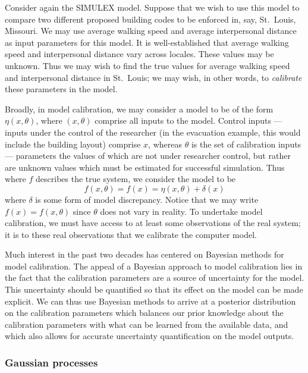 \documentclass{article}
\begin{document}
Consider again the SIMULEX model. Suppose that we wish to use this model to compare two different proposed building codes to be enforced in, say, St.\ Louis, Missouri. We may use average walking speed and average interpersonal distance as input parameters for this model. It is well-established that average walking speed \cite{Bornstein1976} and interpersonal distance \cite{Sorokowska2017} vary across locales. These values may be unknown. Thus we may wish to find the true values for average walking speed and interpersonal distance in St.\ Louis; we may wish, in other words, to \textit{calibrate} these parameters in the model.

Broadly, in model calibration, we may consider a model to be of the form $\eta(x,\theta)$, where $(x,\theta)$ comprise all inputs to the model. Control inputs --- inputs under the control of the researcher (in the evacuation example, this would include the building layout) comprise $x$, whereas $\theta$ is the set of calibration inputs --- parameters the values of which are not under researcher control, but rather are unknown values which must be estimated for successful simulation. Thus where $f$ describes the true system, we consider the model to be 
\begin{equation}f(x,\theta)=f(x)=\eta(x,\theta) + \delta(x)
\end{equation} where $\delta$ is some form of model discrepancy. Notice that we may write $f(x)=f(x,\theta)$ since $\theta$ does not vary in reality. To undertake model calibration, we must have access to at least some observations of the real system; it is to these real observations that we calibrate the computer model.

Much interest in the past two decades has centered on Bayesian methods for model calibration. The appeal of a Bayesian approach to model calibration lies in the fact that the calibration parameters are a source of uncertainty for the model. This uncertainty should be quantified so that its effect on the model can be made explicit. We can thus use Bayesian methods to arrive at a posterior distribution on the calibration parameters which balances our prior knowledge about the calibration parameters with what can be learned from the available data, and which also allows for accurate uncertainty quantification on the model outputs.

\subsubsection{Gaussian processes}
\end{document}
